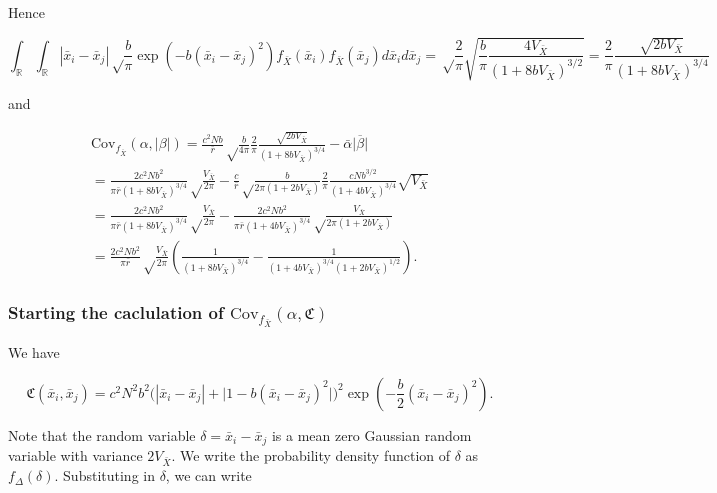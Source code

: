 \documentclass[]{article}
\begin{document}
Hence

\begin{equation}
\int_\mathbb{R}\int_\mathbb{R}|\bar x_i-\bar x_j|\sqrt\frac{b}{\pi}\exp\left(-b(\bar x_i-\bar x_j)^2\right)f_{\bar X}(\bar x_i)f_{\bar X}(\bar x_j)d\bar x_id\bar x_j=\sqrt\frac{2}{\pi}\sqrt{\frac{b}{\pi}\frac{4V_{\bar X}}{(1+8bV_{\bar X})^{3/2}}}=\frac{2}{\pi}\frac{\sqrt{2bV_{\bar X}}}{(1+8bV_{\bar X})^{3/4}}
\end{equation}

and

\begin{multline}
\mathrm{Cov}_{f_{\bar X}}(\alpha,|\beta|)=\frac{c^2Nb}{\bar r}\sqrt\frac{b}{4\pi}\frac{2}{\pi}\frac{\sqrt{2bV_{\bar X}}}{(1+8bV_{\bar X})^{3/4}}-\bar\alpha\overline{|\beta|} \\
=\frac{2c^2Nb^2}{\pi\bar r(1+8bV_{\bar X})^{3/4}}\sqrt\frac{V_{\bar X}}{2\pi}-\frac{c}{\bar r}\sqrt\frac{b}{2\pi(1+2bV_{\bar X})}\frac{2}{\pi}\frac{cNb^{3/2}}{(1+4bV_{\bar X})^{3/4}}\sqrt{V_{\bar X}} \\
=\frac{2c^2Nb^2}{\pi\bar r(1+8bV_{\bar X})^{3/4}}\sqrt\frac{V_{\bar X}}{2\pi}-\frac{2c^2Nb^2}{\pi\bar r(1+4bV_{\bar X})^{3/4}}\sqrt\frac{V_{\bar X}}{2\pi(1+2bV_{\bar X})} \\
=\frac{2c^2Nb^2}{\pi\bar r}\sqrt\frac{V_{\bar X}}{2\pi}\left(\frac{1}{(1+8bV_{\bar X})^{3/4}}-\frac{1}{(1+4bV_{\bar X})^{3/4}(1+2bV_{\bar X})^{1/2}}\right).
\end{multline}

\hypertarget{starting-the-caclulation-of-mathrmcov_f_bar-xalphamathfrakc}{%
\subsubsection{\texorpdfstring{Starting the caclulation of
\(\mathrm{Cov}_{f_{\bar X}}(\alpha,\mathfrak{C})\)
\label{caC}}{Starting the caclulation of \textbackslash{}mathrm\{Cov\}\_\{f\_\{\textbackslash{}bar X\}\}(\textbackslash{}alpha,\textbackslash{}mathfrak\{C\}) }}\label{starting-the-caclulation-of-mathrmcov_f_bar-xalphamathfrakc}}

We have

\begin{equation}
\mathfrak{C}(\bar x_i,\bar x_j)=c^2N^2b^2\Big(|\bar x_i-\bar x_j|+\big|1-b(\bar x_i-\bar x_j)^2\big|\Big)^2\exp\left(-\frac{b}{2}(\bar x_i-\bar x_j)^2\right).
\end{equation}

Note that the random variable \(\delta=\bar x_i-\bar x_j\) is a mean
zero Gaussian random variable with variance \(2V_{\bar X}\). We write
the probability density function of \(\delta\) as
\(f_{\Delta}(\delta)\). Substituting in \(\delta\), we can write
\end{document}
